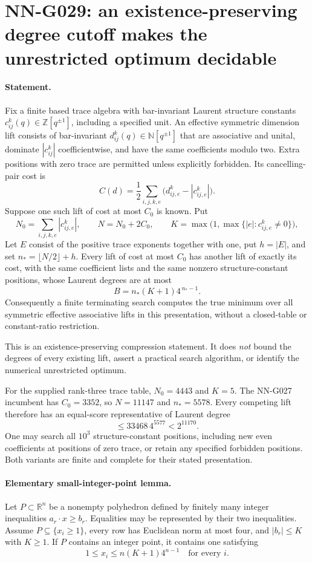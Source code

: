 \section{NN-G029: an existence-preserving degree cutoff makes the unrestricted optimum decidable}
\paragraph{Statement.}
Fix a finite based trace algebra with bar-invariant Laurent
structure constants $c_{ij}^k(q)\in\mathbb Z[q^{\pm1}]$,
including a specified unit. An effective symmetric dimension
lift consists of bar-invariant $d_{ij}^k(q)\in\mathbb N[q^{\pm1}]$
that are associative and unital, dominate $|c_{ij}^k|$
coefficientwise, and have the same coefficients modulo two.
Extra positions with zero trace are permitted unless explicitly
forbidden. Its cancelling-pair cost is
\[
 C(d)=\frac12\sum_{i,j,k,e}
             \bigl(d_{ij,e}^k-|c_{ij,e}^k|\bigr).
\]
Suppose one such lift of cost at most $C_0$ is known.
Put
\[
 N_0=\sum_{i,j,k,e}|c_{ij,e}^k|,\qquad N=N_0+2C_0,
 \qquad K=\max\bigl(1,\max\{|e|:c_{ij,e}^k\ne0\}\bigr),
\]
Let $E$ consist of the positive trace exponents together with one,
put $h=|E|$, and set $n_* =\lfloor N/2\rfloor+h$.
Every lift of cost at most $C_0$ has another lift of exactly
its cost, with the same coefficient lists and the same nonzero
structure-constant positions, whose Laurent degrees are at most
\[
 B=n_*(K+1)4^{\,n_*-1}.                              \tag{G029.1}
\]
Consequently a finite terminating search computes the true
minimum over all symmetric effective associative lifts in
this presentation, without a closed-table or constant-ratio
restriction.

This is an existence-preserving compression statement.
It does \emph{not} bound the degrees of every existing lift,
assert a practical search algorithm, or identify the numerical
unrestricted optimum.

For the supplied rank-three trace table, $N_0=4443$ and $K=5$.
The NN-G027 incumbent has $C_0=3352$, so $N=11147$ and
$n_*=5578$. Every competing lift therefore has an equal-score
representative of Laurent degree
\[
 \le33468\,4^{5577}<2^{11170}.                       \tag{G029.2}
\]
One may search all $10^3$ structure-constant positions, including
new even coefficients at positions of zero trace, or retain any
specified forbidden positions. Both variants are finite and
complete for their stated presentation.

\paragraph{Elementary small-integer-point lemma.}
Let $P\subset\mathbb R^n$ be a nonempty polyhedron defined by
finitely many integer inequalities $a_r\cdot x\ge b_r$.
Equalities may be represented by their two inequalities.
Assume $P\subseteq\{x_i\ge1\}$, every row has Euclidean
norm at most four, and $|b_r|\le K$ with $K\ge1$.
If $P$ contains an integer point, it contains one satisfying
\[
 1\le x_i\le n(K+1)4^{n-1}\quad\text{for every }i.
 \tag{G029.3}
\]

